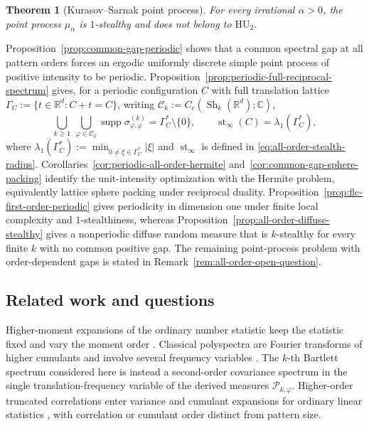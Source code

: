 \documentclass[11pt,reqno,a4paper]{amsart}
\numberwithin{equation}{section}
\theoremstyle{compact}
\newtheorem{maintheorem}{Theorem}
\theoremstyle{definition}
\theoremstyle{definition}
\newcommand{\HU}{\mathrm{HU}}
\newcommand{\Sh}{\operatorname{Sh}}
\begin{document}
\begin{maintheorem}[Kurasov--Sarnak point process]
\label{thm:intro-stealthy-pair}
For every irrational $\alpha>0$, the point process $\mu_\alpha$ is
$1$-stealthy and does not belong to $\HU_2$.
\end{maintheorem}

Proposition~\ref{prop:common-gap-periodic} shows that a common spectral gap at
all pattern orders forces an ergodic uniformly discrete simple point process
of positive intensity to be periodic.  Proposition~\ref{prop:periodic-full-reciprocal-spectrum}
gives, for a periodic configuration $C$ with full translation lattice
$\Gamma_C:=\{t\in\mathbb R^d:C+t=C\}$, writing
$\mathcal C_k:=C_c(\Sh_k(\mathbb R^d);\mathbb C)$,
\[
  \bigcup_{k\geq1}\ \bigcup_{\varphi\in\mathcal C_k}
  \operatorname{supp}\sigma^{(k)}_{\varphi,\varphi}
  =\Gamma_C^*\setminus\{0\},
  \qquad
  \operatorname{st}_\infty(C)=\lambda_1(\Gamma_C^*),
\]
where $\lambda_1(\Gamma_C^*):=\min_{0\neq\xi\in\Gamma_C^*}|\xi|$ and
$\operatorname{st}_\infty$ is defined in
\eqref{eq:all-order-stealth-radius}.
Corollaries~\ref{cor:periodic-all-order-hermite} and~\ref{cor:common-gap-sphere-packing} identify the unit-intensity optimization
with the Hermite problem, equivalently lattice sphere packing under reciprocal
duality.  Proposition~\ref{prop:flc-first-order-periodic} gives periodicity in
dimension one under finite local complexity and $1$-stealthiness, whereas
Proposition~\ref{prop:all-order-diffuse-stealthy} gives a nonperiodic diffuse
random measure that is $k$-stealthy for every finite $k$ with no common positive
gap.  The remaining point-process problem with order-dependent gaps is stated
in Remark~\ref{rem:all-order-open-question}.

\subsection{Related work and questions}
\label{subsec:intro-discussion}

Higher-moment expansions of the ordinary number statistic keep the statistic
fixed and vary the moment order \cite{QT97,TKK21}.  Classical polyspectra are
Fourier transforms of higher cumulants and involve several frequency variables
\cite{Bri94}.  The $k$-th Bartlett spectrum considered here is instead a
second-order covariance spectrum in the single translation-frequency variable
of the derived measures $\mathcal P_{k,\varphi}$.  Higher-order truncated
correlations enter variance and cumulant expansions for ordinary linear
statistics \cite{KY24}, with correlation or cumulant order distinct from
pattern size.
\end{document}
